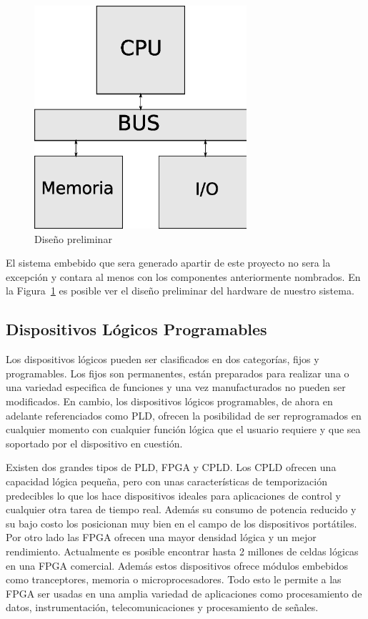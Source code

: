 \begin{figure}[h]
  \centering
	\includegraphics[width=0.70\textwidth]{2-sistema/graf/general.eps}
  \caption{Diseño preliminar}
  \label{figu:diseno}
\end{figure}

El sistema embebido que sera generado apartir de este proyecto no sera la excepción y contara al menos con los componentes anteriormente nombrados. En la Figura~\ref{figu:diseno} es posible ver el diseño preliminar del hardware de nuestro sistema.




\subsection{Dispositivos Lógicos Programables}
Los dispositivos lógicos pueden ser clasificados en dos categorías, fijos y programables. Los fijos son permanentes, están preparados para realizar una o una variedad especifica de funciones y una vez manufacturados no pueden ser modificados.
En cambio, los dispositivos lógicos programables, de ahora en adelante referenciados como PLD, ofrecen la posibilidad de ser reprogramados en cualquier momento con cualquier función lógica que el usuario requiere y que sea soportado por el dispositivo en cuestión.	

Existen dos grandes tipos de PLD, FPGA y CPLD. Los CPLD ofrecen una capacidad lógica pequeña, pero con unas características de temporización predecibles lo que los hace dispositivos ideales para aplicaciones de control y cualquier otra tarea de tiempo real. Además su consumo de potencia reducido y su bajo costo los posicionan muy bien en el campo de los dispositivos portátiles.
Por otro lado las FPGA ofrecen una mayor densidad lógica y un mejor rendimiento. Actualmente es posible encontrar hasta 2 millones de celdas lógicas en una FPGA comercial. Además estos dispositivos ofrece módulos embebidos como tranceptores, memoria o microprocesadores. Todo esto le permite a las FPGA ser usadas en una amplia variedad de aplicaciones como procesamiento de datos, instrumentación, telecomunicaciones y procesamiento de señales.

